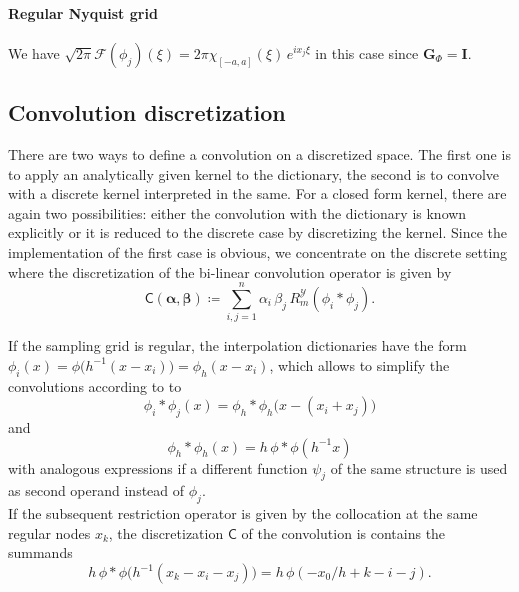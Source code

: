 \documentclass[a4paper]{paper}
\newcommand*{\SPC}[1]{{\ensuremath{\mathscr{#1}}}}
\newcommand*{\OP}[1]{{\ensuremath{\mathcal{#1}}}}
\newcommand{\DISCOP}[1]{{\ensuremath{\mathsf{#1}}}}
\newcommand*{\REST}[2]{\ensuremath{R_{#1}^{#2}}}
\newcommand*{\RmY}{{\ensuremath{\REST{m}{\SPC{Y}}}}}
\newcommand*{\FT}{\OP{F}}
\DeclareMathOperator{\DEFEQ}{{\coloneqq}}
\newcommand*{\I}{\ensuremath{\mathit{i}}}
\newcommand*{\BDalpha}{\boldsymbol{\alpha}}
\newcommand*{\BDbeta}{\boldsymbol{\beta}}
\newcommand*{\BDG}{\boldsymbol{G}}
\newcommand*{\BDI}{\boldsymbol{I}}
\begin{document}
\paragraph{Regular Nyquist grid} 

We have $\sqrt{2\pi} \FT(\phi_j)(\xi) = 2\pi \chi_{[-a,a]}(\xi)\, e^{\I x_j \xi}$ in this case since $\BDG_\Phi = \BDI$.



\subsection{Convolution discretization}
\label{subsec:specif:conv}

There are two ways to define a convolution on a discretized space. The first one is to apply an analytically given 
kernel to the dictionary, the second is to convolve with a discrete kernel interpreted in the same. For a closed form 
kernel, there are again two possibilities: either the convolution with the dictionary is known explicitly or it is 
reduced to the discrete case by discretizing the kernel. Since the implementation of the first case is obvious, we 
concentrate on the discrete setting where the discretization of the bi-linear convolution operator is given by
%
\begin{equation*}
 \DISCOP{C}(\BDalpha, \BDbeta) \DEFEQ \sum_{i,j=1}^n \alpha_i\, \beta_j\, \RmY(\phi_i \ast \phi_j).
\end{equation*}

If the sampling grid is regular, the interpolation dictionaries have the form 
$\phi_i(x) = \phi\big( h^{-1}(x-x_i) \big) = \phi_h(x-x_i)$, which allows to simplify the convolutions according to to
%
\begin{equation*}
 \phi_i \ast \phi_j(x) = \phi_h \ast \phi_h\big( x - (x_i + x_j) \big)
\end{equation*}
%
and
%
\begin{equation*}
 \phi_h \ast \phi_h(x) = h\, \phi \ast \phi(h^{-1} x)
\end{equation*}
%
with analogous expressions if a different function $\psi_j$ of the same structure is used as second operand instead of 
$\phi_j$.\\
%
If the subsequent restriction operator is given by the collocation at the same regular nodes $x_k$, the discretization 
$\DISCOP{C}$ of the convolution is contains the summands
%
\begin{equation*}
 h\, \phi \ast \phi\big( h^{-1}(x_k - x_i - x_j) \big) = h\, \phi( -x_0/h + k - i - j).
\end{equation*}
\end{document}
